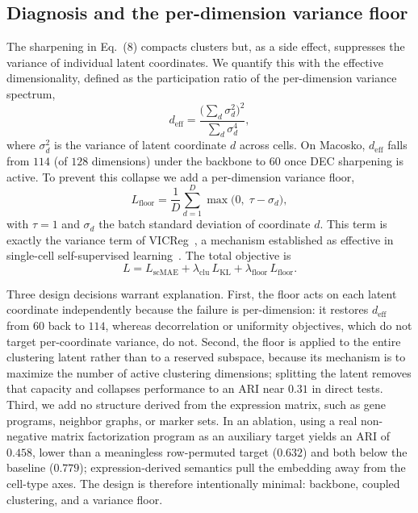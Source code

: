 \subsection{Diagnosis and the per-dimension variance floor}

The sharpening in Eq.~(8) compacts clusters but, as a side effect, suppresses the variance
of individual latent coordinates. We quantify this with the effective dimensionality,
defined as the participation ratio of the per-dimension variance spectrum,
\begin{equation}
d_{\mathrm{eff}} = \frac{\bigl(\sum_d \sigma_d^2\bigr)^2}{\sum_d \sigma_d^4},
\end{equation}
where $\sigma_d^2$ is the variance of latent coordinate $d$ across cells. On Macosko,
$d_{\mathrm{eff}}$ falls from $114$ (of $128$ dimensions) under the backbone to $60$ once
DEC sharpening is active. To prevent this collapse we add a per-dimension variance floor,
\begin{equation}
L_{\mathrm{floor}} = \frac{1}{D}\sum_{d=1}^{D}\max\!\bigl(0,\;\tau - \sigma_d\bigr),
\end{equation}
with $\tau = 1$ and $\sigma_d$ the batch standard deviation of coordinate $d$. This term
is exactly the variance term of VICReg~\citep{vicreg2022}, a mechanism established as
effective in single-cell self-supervised learning~\citep{scsslbench2025}. The total
objective is
\begin{equation}
L = L_{\mathrm{scMAE}} + \lambda_{\mathrm{clu}}\,L_{\mathrm{KL}}
    + \lambda_{\mathrm{floor}}\,L_{\mathrm{floor}}.
\end{equation}

Three design decisions warrant explanation. First, the floor acts on each latent
coordinate independently because the failure is per-dimension: it restores
$d_{\mathrm{eff}}$ from $60$ back to $114$, whereas decorrelation or uniformity objectives,
which do not target per-coordinate variance, do not. Second, the floor is applied to the
entire clustering latent rather than to a reserved subspace, because its mechanism is to
maximize the number of active clustering dimensions; splitting the latent removes that
capacity and collapses performance to an ARI near $0.31$ in direct tests. Third, we add no
structure derived from the expression matrix, such as gene programs, neighbor graphs, or
marker sets. In an ablation, using a real non-negative matrix factorization program as an
auxiliary target yields an ARI of $0.458$, lower than a meaningless row-permuted target
($0.632$) and both below the baseline ($0.779$); expression-derived semantics pull the
embedding away from the cell-type axes. The design is therefore intentionally minimal:
backbone, coupled clustering, and a variance floor.

